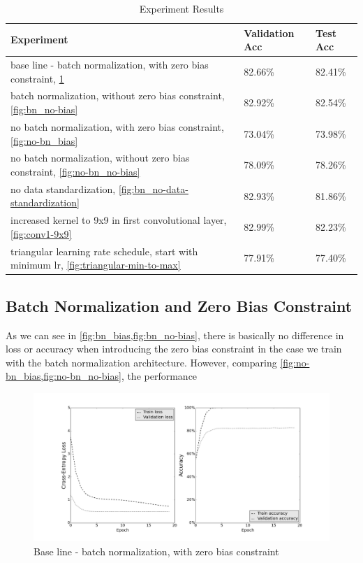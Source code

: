 \documentclass[a4paper, 11pt]{article}
\begin{document}
\begin{table}[!h]
	\begin{center}
		\begin{tabularx}{\linewidth}{|X|l|l|}
			\hline \textbf{Experiment} & \textbf{Validation Acc} & \textbf{Test Acc}\\ 
			\hline base line - batch normalization, with zero bias constraint, \cref{fig:bn_bias} & 82.66\% & 82.41\% \\
			\hline batch normalization, without zero bias constraint, \cref{fig:bn_no-bias} & 82.92\% & 82.54\% \\
			\hline no batch normalization, with zero bias constraint, \cref{fig:no-bn_bias} & 73.04\% & 73.98\% \\
			\hline no batch normalization, without zero bias constraint, \cref{fig:no-bn_no-bias} & 78.09\% & 78.26\% \\
			\hline no data standardization, \cref{fig:bn_no-data-standardization} & 82.93\% & 81.86\% \\
			\hline increased kernel to 9x9 in first convolutional layer, \cref{fig:conv1-9x9} & 82.99\% & 82.23\% \\
			\hline triangular learning rate schedule, start with minimum lr, \cref{fig:triangular-min-to-max} & 77.91\% & 77.40\% \\
			\hline
		\end{tabularx}
	\end{center}
	\caption{Experiment Results}
	\label{tab:experiment-results}
\end{table}

\clearpage
\subsection{Batch Normalization and Zero Bias Constraint} \label{sec:batch}

As we can see in \cref{fig:bn_bias,fig:bn_no-bias}, there is basically no difference in loss or accuracy when introducing the zero bias constraint in the case we train with the batch normalization architecture.
However, comparing \cref{fig:no-bn_bias,fig:no-bn_no-bias}, the performance


\begin{figure}[H]
	\includegraphics[width=\linewidth]{bn_bias-constraint.png}
	\caption{Base line - batch normalization, with zero bias constraint}
	\label{fig:bn_bias}
\end{figure}
\end{document}
